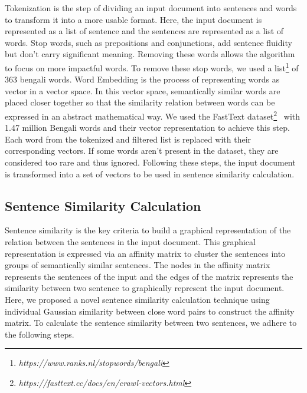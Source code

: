 Tokenization is the step of dividing an input document into sentences and words to transform it into a more usable format. Here, the input document is represented as a list of sentence and the sentences are represented as a list of words. Stop words, such as prepositions and conjunctions, add sentence fluidity but don’t carry significant meaning. Removing these words allows the algorithm to focus on more impactful words. To remove these stop words, we used a list\footnote{\textit{https://www.ranks.nl/stopwords/bengali}} of 363 bengali words. Word Embedding is the process of representing  words as vector in a vector space. In this vector space, semantically similar words are placed closer together so that the similarity relation between words can be expressed in an abstract mathematical way. We used the FastText dataset\footnote{\textit{https://fasttext.cc/docs/en/crawl-vectors.html}}~\cite{grave-etal-2018-fasttext} with 1.47 million Bengali words and their vector representation to achieve this step. Each word from the tokenized and filtered list is replaced with their corresponding vectors. If some words aren't present in the dataset, they are considered too rare and thus ignored. Following these steps, the input document is transformed into a set of vectors to be used in sentence similarity calculation. 

\subsection{Sentence Similarity Calculation}\label{subsec:sentence-similarity-calculation}
Sentence similarity is the key criteria to build a graphical representation of the relation between the sentences in the input document. This graphical representation is expressed via an affinity matrix to cluster the sentences into groups of semantically similar sentences. The nodes in the affinity matrix represents the sentences of the input and the edges of the matrix represents the similarity between two sentence to graphically represent the input document. Here, we proposed a novel sentence similarity calculation technique using individual Gaussian similarity between close word pairs to construct the affinity matrix. To calculate the sentence similarity between two sentences, we adhere to the following steps.\\

